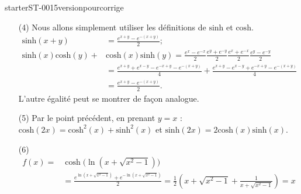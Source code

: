 
\begin{corrige}{starterST-0015versionpourcorrige}
\begin{enumerate}
\item[(4)] Nous allons simplement utiliser les définitions de $\text{sinh}$ et  $\text{cosh}$. 
  \begin{equation*}
    \begin{aligned}
      \text{sinh} (x+y)& = \frac{e^{x+y}-e^{-(x+y)}}{2} ; \\
      \text{sinh}(x) \text{cosh}(y)+&\text{cosh}(x)\text{sinh}(y) =\frac{e^{x}-e^{-x}}{2}\frac{e^{y}+e^{-y}}{2}\frac{e^{x}+e^{-x}}{2}\frac{e^{y}-e^{-y}}{2}\\
      &=\frac{e^{x+y}+e^{x-y}-e^{-x+y}-e^{-(x+y)}}{4} +\frac{e^{x+y}-e^{x-y}+e^{-x+y}-e^{-(x+y)}}{4} \\
      &=\frac{e^{x+y}-e^{-(x+y)}}{2}. 
    \end{aligned}
  \end{equation*}
  L'autre égalité peut se montrer de façon analogue.
\item[(5)] Par le point précédent, en prenant $y=x$ : $\text{cosh}(2x)=\text{cosh}^2(x)+\text{sinh}^2(x) $ et $\text{sinh}(2x)= 2\text{cosh}(x)\text{sinh}(x) $.
 \item[(6)] 
   \begin{equation*}
     \begin{aligned}
       f(x)=&\cosh\Big(\ln(x+\sqrt{x^2-1})\Big)\\
       &=\frac{e^{\ln(x+\sqrt{x^2-1})}+e^{-\ln(x+\sqrt{x^2-1})}}{2} = \frac{1}{2}\left(x+\sqrt{x^2-1} + \frac{1}{x+\sqrt{x^2-1}}\right) =x
     \end{aligned}
   \end{equation*}
\end{enumerate}

\end{corrige}
